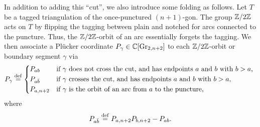 In addition to adding this ``cut'', we also introduce some folding as follows. Let $T$
be a tagged triangulation of the once-punctured $(n+1)$-gon. The group $\mathbb{Z}/2\mathbb{Z}$
acts on $T$ by flipping the tagging between plain and notched for arcs connected to the
puncture. Thus, the $\mathbb{Z}/2\mathbb{Z}$-orbit of an arc essentially forgets the tagging. We
then associate a Plücker coordinate $P_\gamma \in \mathbb{C}[\operatorname{Gr}_{2, n+2}]$ to each
$\mathbb{Z}/2\mathbb{Z}$-orbit or boundary segment $\gamma$ via
\begin{equation*}
	P_\gamma \defeq \begin{dcases*}
		P_{ab}       & if $\gamma$ does not cross the cut, and has endpoints $a$ and $b$ with $b>a$, \\
		P_{a\bar{b}} & if $\gamma$ crosses the cut, and has endpoints $a$ and $b$ with $b>a$,        \\
		P_{a, n+2}   & if $\gamma$ is the orbit of an arc from $a$ to the puncture,
	\end{dcases*}
\end{equation*}
%
where
\begin{equation*}
	P_{a\bar{b}} \overset{\mathrm{def}}{=} P_{a, n+2}P_{b,n+2} - P_{ab}.
\end{equation*}

